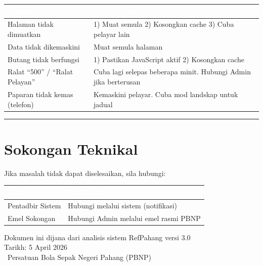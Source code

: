 \documentclass[12pt,a4paper]{report}
\begin{document}
\begin{longtable}{L{5cm} L{9cm}}
\toprule
{}
\textcolor{white}{\textbf{Masalah}} & \textcolor{white}{\textbf{Penyelesaian}} \\
\midrule
\endhead
{}
Halaman tidak dimuatkan & 1) Muat semula 2) Kosongkan cache 3) Cuba pelayar lain \\
Data tidak dikemaskini & Muat semula halaman \\
Butang tidak berfungsi & 1) Pastikan JavaScript aktif 2) Kosongkan cache \\
Ralat ``500'' / ``Ralat Pelayan'' & Cuba lagi selepas beberapa minit. Hubungi Admin jika berterusan \\
Paparan tidak kemas (telefon) & Kemaskini pelayar. Cuba mod landskap untuk jadual \\
\bottomrule
\end{longtable}

\vspace{1cm}

\begin{center}
\textcolor{pbnpgold}{\rule{8cm}{2pt}}
\end{center}

\vspace{0.5cm}

\section*{Sokongan Teknikal}

Jika masalah tidak dapat diselesaikan, sila hubungi:

\begin{table}[H]
\centering
\begin{tabularx}{0.7\textwidth}{l X}
\toprule
\rowcolor{tableheader}
\textcolor{white}{\textbf{Saluran}} & \textcolor{white}{\textbf{Maklumat}} \\
\midrule
\rowcolor{tablebg}
Pentadbir Sistem & Hubungi melalui sistem (notifikasi) \\
Emel Sokongan & Hubungi Admin melalui emel rasmi PBNP \\
\bottomrule
\end{tabularx}
\end{table}

\vspace{2cm}

\begin{center}
{\small\textcolor{pbnpblue!50}{Dokumen ini dijana dari analisis sistem RefPahang versi 3.0}}\\
{\small\textcolor{pbnpblue!50}{Tarikh: 5 April 2026}}\\[0.3cm]
{\small\textcolor{pbnpblue!50}{\textcopyright\ Persatuan Bola Sepak Negeri Pahang (PBNP)}}
\end{center}
\end{document}
